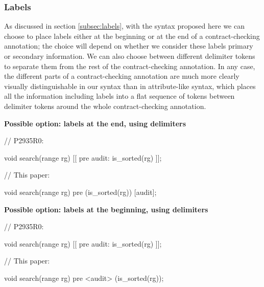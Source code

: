 \subsubsection{Labels}

As discussed in section \ref{subsec:labels}, with the syntax proposed here we can choose to place labels either at the beginning or at the end of a contract-checking annotation; the choice will depend on whether we consider these labels primary or secondary information. We can also choose between different delimiter tokens to separate them from the rest of the contract-checking annotation. In any case, the different parts of a contract-checking annotation are much more clearly visually distinguishable in our syntax than in attribute-like syntax, which places all the information including labels into a flat sequence of tokens between delimiter tokens around the whole contract-checking annotation.

\vspace{3mm}
\textbf{Possible option: labels at the end, using \tcode{[...]} delimiters}
\vspace{3mm}

\begin{minipage}{8cm}
\begin{codeblock}
// P2935R0:

void search(range rg)
  [[ pre audit: is_sorted(rg) ]];
\end{codeblock}
\end{minipage}
\begin{minipage}{8cm}
\begin{codeblock}
// This paper:

void search(range rg)
  pre (is_sorted(rg)) [audit];
\end{codeblock}
\end{minipage}

\vspace{3mm}
\textbf{Possible option: labels at the beginning, using  delimiters}
\vspace{3mm}

\begin{minipage}{8cm}
\begin{codeblock}
// P2935R0:

void search(range rg)
  [[ pre audit: is_sorted(rg) ]];
\end{codeblock}
\end{minipage}
\begin{minipage}{8cm}
\begin{codeblock}
// This paper:

void search(range rg)
  pre <audit> (is_sorted(rg));
\end{codeblock}
\end{minipage}

